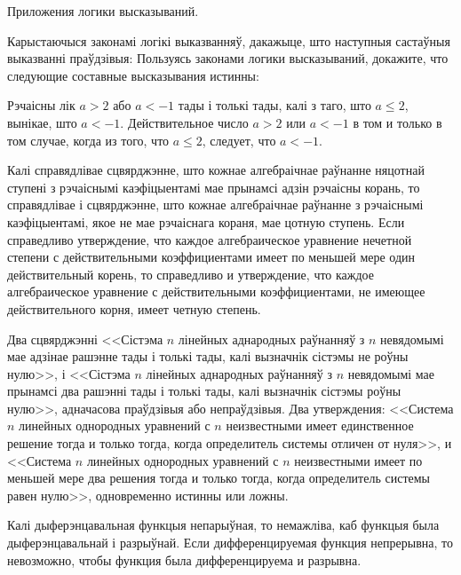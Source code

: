 



{Приложения логики высказываний.}

\begin{problemList}

\problemItemSimple
{Карыстаючыся законамі логікі выказванняў, дакажыце, што наступныя састаўныя выказванні праўдзівыя:}
{Пользуясь законами логики высказываний, докажите, что следующие составные высказывания истинны:}

\begin{belarusianEnumerate}

\problemItemSimple
{Рэчаісны лік $a > 2$ або $a < -1$ тады і толькі тады, калі з таго, што $a \le 2$, вынікае, што $a < -1$.}
{Действительное число $a > 2$ или $a < -1$ в том и только в том случае, когда из того, что $a \le 2$, следует, что $a < -1$.}

\problemItemSimple
{Калі справядлівае сцвярджэнне, што кожнае алгебраічнае раўнанне няцотнай ступені з рэчаіснымі каэфіцыентамі мае прынамсі адзін рэчаісны корань, то справядлівае і сцвярджэнне, што кожнае алгебраічнае раўнанне з рэчаіснымі каэфіцыентамі, якое не мае рэчаіснага кораня, мае цотную ступень.}
{Если справедливо утверждение, что каждое алгебраическое уравнение нечетной степени с действительными коэффициентами имеет по меньшей мере один действительный корень, то справедливо и утверждение, что каждое алгебраическое уравнение с действительными коэффициентами, не имеющее действительного корня, имеет четную степень.}

\problemItemSimple
{Два сцвярджэнні <<Сістэма $n$ лінейных аднародных раўнанняў з $n$ невядомымі мае адзінае рашэнне тады і толькі тады, калі вызначнік сістэмы не роўны нулю>>, і <<Сістэма $n$ лінейных аднародных раўнанняў з $n$ невядомымі мае прынамсі два рашэнні тады і толькі тады, калі вызначнік сістэмы роўны нулю>>, адначасова праўдзівыя або непраўдзівыя.}
{Два утверждения: <<Система $n$ линейных однородных уравнений с $n$ неизвестными имеет единственное решение тогда и только тогда, когда определитель системы отличен от нуля>>, и <<Система $n$ линейных однородных уравнений с $n$ неизвестными имеет по меньшей мере два решения тогда и только тогда, когда определитель системы равен нулю>>, одновременно истинны или ложны.}

\problemItemSimple
{Калі дыферэнцавальная функцыя непарыўная, то немажліва, каб функцыя была дыферэнцавальнай і разрыўнай.}
{Если дифференцируемая функция непрерывна, то невозможно, чтобы функция была дифференцируема и разрывна.}


\end{belarusianEnumerate}
\end{problemList}
